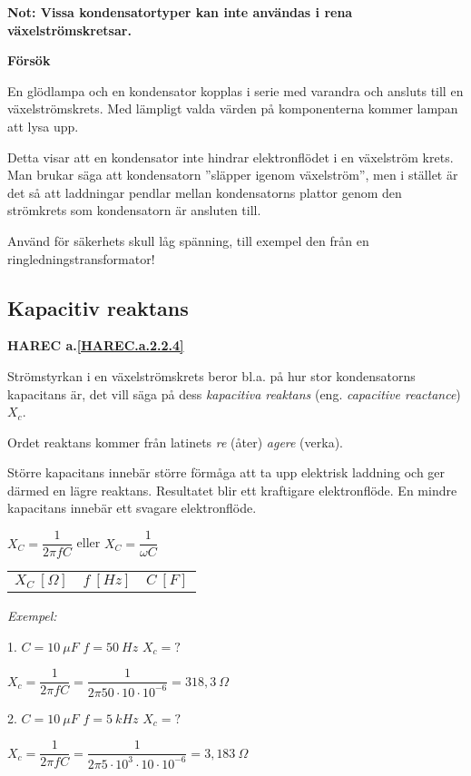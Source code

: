 \textbf{Not: Vissa kondensatortyper kan inte användas i rena
  växelströmskretsar.}

\textbf{Försök}

En glödlampa och en kondensator kopplas i serie med varandra och ansluts till en
växelströmskrets. Med lämpligt valda värden på komponenterna kommer lampan att
lysa upp.

Detta visar att en kondensator inte hindrar elektronflödet i en växelström
krets. Man brukar säga att kondensatorn ''släpper igenom växelström'', men i
stället är det så att laddningar pendlar mellan kondensatorns plattor genom den
strömkrets som kondensatorn är ansluten till.

Använd för säkerhets skull låg spänning, till exempel den från en
ringledningstransformator!

\subsection{Kapacitiv reaktans}
\textbf{HAREC a.\ref{HAREC.a.2.2.4}\label{myHAREC.a.2.2.4}}

Strömstyrkan i en växelströmskrets beror bl.a. på hur stor kondensatorns
kapacitans är, det vill säga på dess \emph{kapacitiva reaktans} (eng.
\emph{capacitive reactance}) \(X_c\).

Ordet reaktans kommer från latinets \emph{re} (åter) \emph{agere} (verka).

Större kapacitans innebär större förmåga att ta upp elektrisk laddning och ger
därmed en lägre reaktans. Resultatet blir ett kraftigare elektronflöde.
En mindre kapacitans innebär ett svagare elektronflöde.

\(X_C = \dfrac{1}{2\pi fC}\) eller \(X_C = \dfrac{1}{\omega C}\)

\begin{tabular}{lll}
\(X_C\ [\Omega]\) & \(f\ [Hz]\) & \(C\ [F]\) 
\end{tabular}

\emph{Exempel:}

1. \(C = 10\ \mu F\) \(f = 50\ Hz\) \(X_c = ?\)

\(X_c = \dfrac{1}{2\pi fC} = \dfrac{1}{2\pi 50 \cdot 10 \cdot 10^{-6}} = 318,3\ \Omega\)

2. \(C = 10\ \mu F\) \(f = 5\ kHz\) \(X_c = ?\)

\(X_c = \dfrac{1}{2\pi fC} = \dfrac{1}{2\pi 5 \cdot 10^3 \cdot 10 \cdot 10^{-6}}
= 3,183\ \Omega\)


